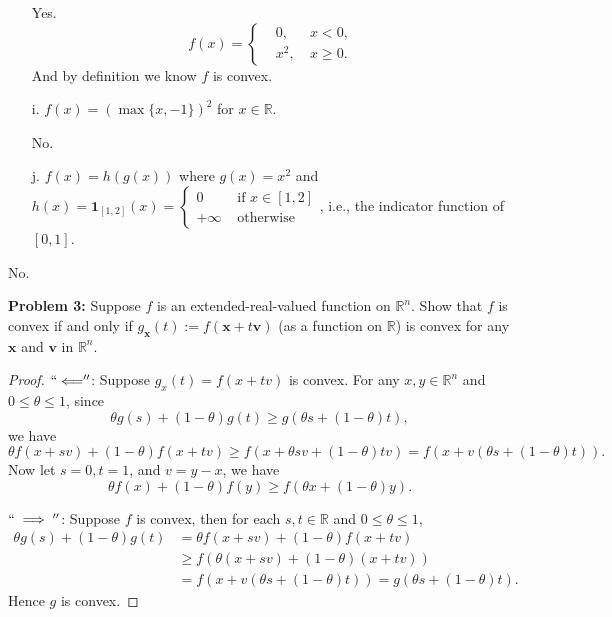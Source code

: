 \documentclass{article}
\newcommand{\bx}{{\mathbf x}}
\newcommand{\bv}{{\mathbf v}}
\begin{document}
\begin{enumerate}
Yes. 
$$
f(x) = \left\{
\begin{aligned}
&0, &\ x < 0, \\
&x^2, &\ x \ge 0.
\end{aligned}
\right.
$$
And by definition we know $f$ is convex.

\item[i.] $f(x)=(\max\{x,-1\})^2$ for $x\in\mathbb{R}$.

No.

\item[j.] $f(x)=h(g(x))$ where $g(x)=x^2$ and $h(x)=\mathbf{1}_{[1,2]}(x)=\left\{\begin{array}{ll}0&\text{ if }x\in[1,2]\\+\infty&\text{ otherwise}\end{array}\right.$, i.e., the indicator function of $[0,1]$.
\end{enumerate}

No.


\noindent\textbf{Problem 3:} Suppose $f$ is an extended-real-valued function on $\mathbb{R}^n$.
Show that $f$ is convex if and only if $g_{\bx}(t):=f(\bx+t\bv)$ (as a function on $\mathbb R$) is convex for any $\bx$ and $\bv$ in $\mathbb{R}^n$.

\begin{proof}
$``\Longleftarrow''$: 
Suppose $g_x(t) = f(x+tv) $ is convex. For any $x, y \in\mathbb{R}^n $ and $0\le \theta\le 1$, since 
$$
\theta g(s) + (1-\theta)g(t) \ge g(\theta s + (1-\theta)t),
$$
we have
$$
\theta f(x+sv) + (1-\theta) f(x+tv) \ge f(x+\theta sv+(1-\theta)tv) = f(x+v(\theta s+ (1-\theta)t)).
$$
Now let $s = 0, t = 1$, and $v = y-x$, we have
$$
\theta f(x) + (1-\theta)f(y) \ge f(\theta x + (1-\theta)y).
$$


$``\implies''$:
Suppose $f$ is convex, then for each $s, t  \in\mathbb{R} $ and $0\le \theta \le 1$, 
$$
\begin{aligned}
\theta g(s) + (1-\theta)g(t) &= \theta f(x+sv) + (1-\theta) f(x+tv) \\
&\ge f(\theta(x+sv)+(1-\theta)(x+tv)) \\
&=f(x+v(\theta s+ (1-\theta)t)) = g(\theta s+ (1-\theta)t).
\end{aligned}
$$
Hence $g$ is convex.

\end{proof}
\end{document}
